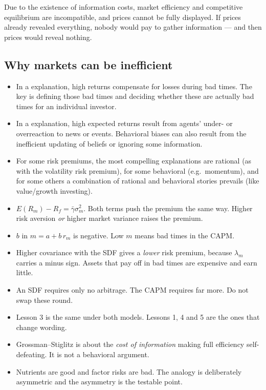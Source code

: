 \begin{imdefbox}[title={The Grossman--Stiglitz paradox}]
Due to the existence of information costs, market efficiency and competitive
equilibrium are incompatible, and prices cannot be fully displayed. If prices
already revealed everything, nobody would pay to gather information --- and then
prices would reveal nothing.
\end{imdefbox}

\subsection{Why markets can be inefficient}

\begin{itemize}
\item In a  explanation, high returns compensate for losses during
bad times. The key is defining those bad times and deciding whether these are
actually bad times for an individual investor.
\item In a  explanation, high expected returns result from
agents' under- or overreaction to news or events. Behavioral biases can also
result from the inefficient updating of beliefs or ignoring some information.
\item For some risk premiums, the most compelling explanations are rational (as
with the volatility risk premium), for some behavioral (e.g.\ momentum), and for
some others a combination of rational and behavioral stories prevails (like
value/growth investing).
\end{itemize}

\begin{imtrapbox}[title={Consolidated trap summary --- IM-1}]
\begin{itemize}
\item {} $E(R_m)-R_f = \bar{\gamma}\sigma_m^2$. Both terms push
the premium the same way. Higher risk aversion \emph{or} higher market variance
raises the premium.
\item {} $b$ in $m = a + b\,r_m$ is negative. Low $m$ means bad
times in the CAPM.
\item {} Higher covariance with the SDF gives a
\emph{lower} risk premium, because $\lambda_m$ carries a minus sign. Assets that
pay off in bad times are expensive and earn little.
\item {} An SDF requires only no arbitrage. The CAPM requires
far more. Do not swap these round.
\item {} Lesson 3 is the same under both models. Lessons 1,
4 and 5 are the ones that change wording.
\item {} Grossman--Stiglitz is about the \emph{cost of
information} making full efficiency self-defeating. It is not a behavioral
argument.
\item {} Nutrients are good and factor risks are bad.
The analogy is deliberately asymmetric and the asymmetry is the testable point.
\end{itemize}
\end{imtrapbox}

